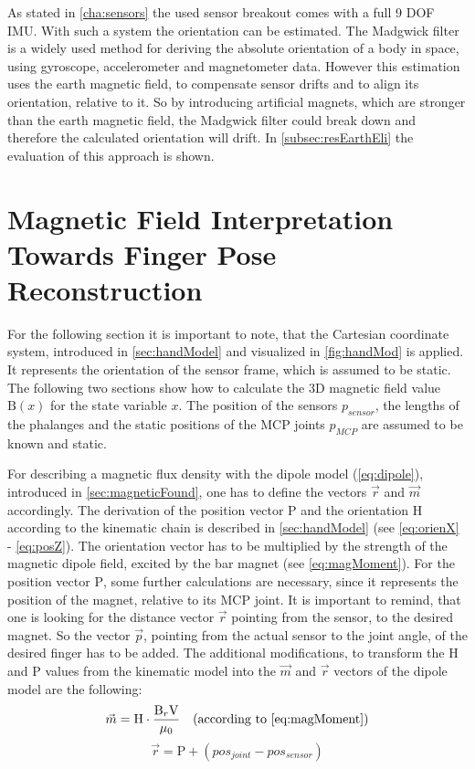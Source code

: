 As stated in \ref{cha:sensors} the used sensor breakout comes with a full 9 \ac{DOF} \ac{IMU}. With such a system the orientation can be estimated. The Madgwick filter \cite{madgwick2010efficient} is a widely used method for deriving the absolute orientation of a body in space, using gyroscope, accelerometer and magnetometer data. However this estimation uses the earth magnetic field, to compensate sensor drifts and to align its orientation, relative to it. So by introducing artificial magnets, which are stronger than the earth magnetic field, the Madgwick filter could break down and therefore the calculated orientation will drift. In \ref{subsec:resEarthEli} the evaluation of this approach is shown. 




\section{Magnetic Field Interpretation Towards Finger Pose Reconstruction} \label{sec:magmodel}

For the following section it is important to note, that the Cartesian coordinate system, introduced in \ref{sec:handModel} and visualized in \ref{fig:handMod} is applied. It represents the orientation of the sensor frame, which is assumed to be static. The following two sections show how to calculate the 3D magnetic field value $ \mathrm{B}(x) $ for the state variable $ x $. The position of the sensors $ p_{sensor} $, the lengths of the phalanges and the static positions of the \ac{MCP} joints $ p_{MCP} $ are assumed to be known and static.

For describing a magnetic flux density with the dipole model (\ref{eq:dipole}), introduced in \ref{sec:magneticFound}, one has to define the vectors $ \vec{r} $ and $ \vec{m} $ accordingly. The derivation of the position vector $ \mathrm{P} $  and the orientation $ \mathrm{H} $ according to the kinematic chain is described in \ref{sec:handModel} (see \ref{eq:orienX} - \ref{eq:posZ}). The orientation vector has to be multiplied by the strength of the magnetic dipole field, excited by the bar magnet (see \ref{eq:magMoment}). For the position vector $ \mathrm{P} $, some further calculations are necessary, since it represents the position of the magnet, relative to its \ac{MCP} joint. It is important to remind, that one is looking for the distance vector $ \vec{r} $ pointing from the sensor, to the desired magnet. So the vector $ \vec{p} $, pointing from the actual sensor to the joint angle, of the desired finger has to be added. The additional modifications, to transform the $ \mathrm{H} $ and $ \mathrm{P} $ values from the kinematic model into the $ \vec{m} $ and $ \vec{r} $ vectors of the dipole model are the following:\\
\begin{equation}
\vec{m} = \mathrm{H} \cdot \frac{\mathrm{B}_r \mathrm{V}}{\mu_{0}} \quad \text{(according to \ref{eq:magMoment})}
\end{equation}
\begin{equation}
\vec{r} = \mathrm{P} + (pos_{joint} - pos_{sensor})
\end{equation}


